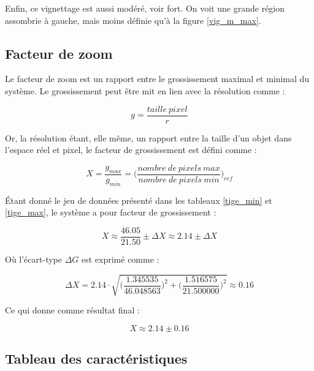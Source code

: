 \documentclass[11pt,letterpaper]{article}
\begin{document}
Enfin, ce vignettage est aussi modéré, voir fort. On voit une grande région 
assombrie à gauche, mais moins définie qu'à la figure \ref{vig_m_max}.

\subsection{Facteur de zoom}
Le facteur de zoom est un rapport entre le grossissement maximal et minimal du système. Le grossissement peut être mit en lien avec la résolution comme : 

\begin{equation*}
    g = \frac{taille \: pixel}{r}
\end{equation*}

Or, la résolution étant, elle même, un rapport entre la taille d'un objet dans l'espace réel et pixel, le facteur de grossissement est défini comme : 

\begin{equation*}
    X = \frac{g_{max}}{g_{min}} = \biggl(\frac{nombre \: de \: pixels \: max}{nombre \: de \: pixels \: min}\biggr)_{ref}
\end{equation*}

Étant donné le jeu de données présenté dans les tableaux \ref{tige_min} et \ref{tige_max}, le système a pour facteur de grossissement : 

\begin{equation*}
    X \approx \frac{46.05}{21.50} \pm \Delta X \approx 2.14 \pm \Delta X
\end{equation*}

Où l'écart-type $\Delta G$ est exprimé comme : 

\begin{equation*}
    \Delta X = 2.14 \cdot \sqrt{\biggl(\frac{1.345535}{46.048563}\biggr)^2 + \biggl(\frac{1.516575}{21.500000}\biggr)^2} \approx 0.16
\end{equation*}

Ce qui donne comme résultat final : 

\begin{equation*}
    X \approx 2.14 \pm 0.16
\end{equation*}

\subsection{Tableau des caractéristiques}
\end{document}
